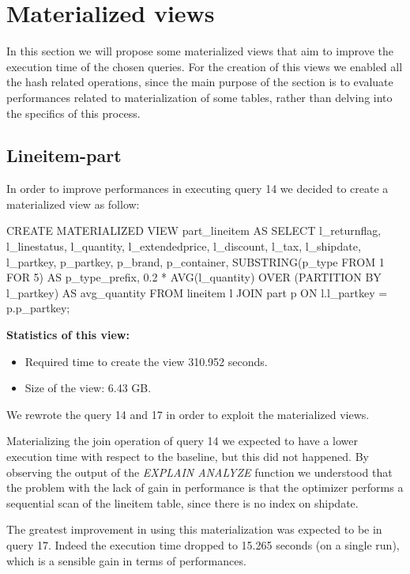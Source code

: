 \section{Materialized views}
In this section we will propose some materialized views that aim to improve the execution time of the chosen queries. For the creation of this views we enabled all the hash related operations, since the main purpose of the section is to evaluate performances related to  materialization of some tables, rather than delving into the specifics of this process.

\subsection{Lineitem-part}
\label{ssec:lineitem-part}
In order to improve performances in executing query 14 we decided to create a materialized view as follow:
\begin{sql}
CREATE MATERIALIZED VIEW part_lineitem AS
SELECT
    l_returnflag,
    l_linestatus,
    l_quantity,
    l_extendedprice,
    l_discount,
    l_tax,
    l_shipdate,
    l_partkey,
    p_partkey,
    p_brand,
    p_container,
    SUBSTRING(p_type FROM 1 FOR 5) AS p_type_prefix,
    0.2 * AVG(l_quantity) OVER (PARTITION BY l_partkey) AS avg_quantity
FROM
    lineitem l
JOIN
    part p ON l.l_partkey = p.p_partkey;
\end{sql}

\textbf{Statistics of this view:}
\begin{itemize}
    \item Required time to create the view 310.952 seconds.
    \item Size of the view: 6.43 GB.
\end{itemize}

We rewrote the query 14 and 17 in order to exploit the materialized views.


Materializing the join operation of query 14 we expected to have a lower execution time with respect to the baseline, but this did not happened. By observing the output of the \emph{EXPLAIN ANALYZE} function we understood that the problem with the lack of gain in performance is that the optimizer performs a sequential scan of the lineitem table, since there is no index on shipdate.

The greatest improvement in using this materialization was expected to be in query 17. Indeed the execution time dropped to 15.265 seconds (on a single run), which is a sensible gain in terms of performances. 

